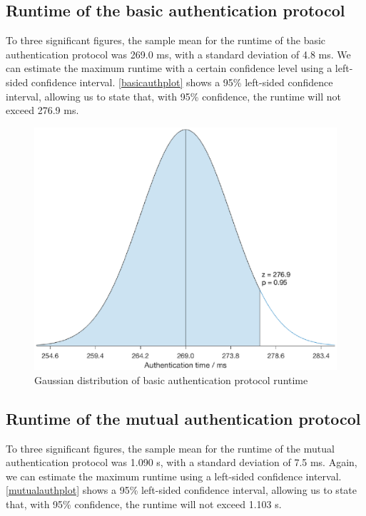 \documentclass[12pt,a4paper,twoside,openright]{report}
\begin{document}
\subsection{Runtime of the basic authentication protocol}

To three significant figures, the sample mean for the runtime of the basic authentication protocol was 269.0 ms, with a standard deviation of 4.8 ms. We can estimate the maximum runtime with a certain confidence level using a left-sided confidence interval. \autoref{basicauthplot} shows a 95\% left-sided confidence interval, allowing us to state that, with 95\% confidence, the runtime will not exceed 276.9 ms.

\begin{figure}[tbh]
\centerline{\includegraphics[scale=0.8]{figures/basicauthplot.eps}}
\caption{Gaussian distribution of basic authentication protocol runtime}
\label{basicauthplot}
\end{figure}

\subsection{Runtime of the mutual authentication protocol}

To three significant figures, the sample mean for the runtime of the mutual authentication protocol was 1.090 s, with a standard deviation of 7.5 ms. Again, we can estimate the maximum runtime using a left-sided confidence interval. \autoref{mutualauthplot} shows a 95\% left-sided confidence interval, allowing us to state that, with 95\% confidence, the runtime will not exceed 1.103 s.
\end{document}
